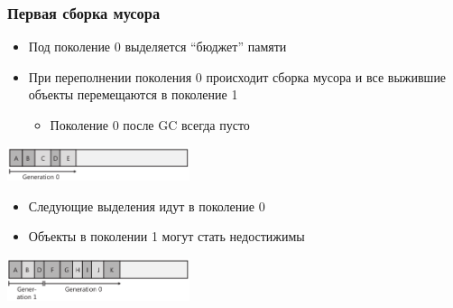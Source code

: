 \documentclass[xetex,mathserif,serif]{beamer}
\begin{document}
	\begin{frame}
		\frametitle{Первая сборка мусора}
		\begin{itemize}
			\item Под поколение 0 выделяется ``бюджет'' памяти
			\item При переполнении поколения 0 происходит сборка мусора и все выжившие объекты перемещаются в поколение 1
			\begin{itemize}
				\item Поколение 0 после GC всегда пусто
			\end{itemize}
		\end{itemize}
		\begin{center}
			\includegraphics[width=0.4\textwidth]{generation0.png}
		\end{center}
		\begin{itemize}
			\item Следующие выделения идут в поколение 0
			\item Объекты в поколении 1 могут стать недостижимы
		\end{itemize}
		\begin{center}
			\includegraphics[width=0.4\textwidth]{generation1.png}
		\end{center}
	\end{frame}
\end{document}
